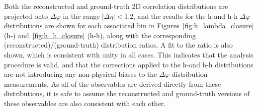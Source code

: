 Both the reconstructed and ground-truth 2D correlation distributions are projected onto $\Delta\varphi$ in the range $|\Delta\eta| < 1.2$, and the results for the h-\lmb and h-h $\Delta\varphi$ distributions are shown for each associated \pt bin in Figures~\ref{fig:h_lambda_closure} (h-\lmb) and~\ref{fig:h_h_closure} (h-h), along with the corresponding (reconstructed)/(ground-truth) distribution ratios. A fit to the ratio is also shown, which is consistent with unity in all cases. This indicates that the analysis procedure is valid, and that the corrections applied to the h-\lmb and h-h distributions are not introducing any non-physical biases to the $\Delta\varphi$ distribution measurements. As all of the observables are derived directly from these distributions, it is safe to assume the reconstructed and ground-truth versions of these observables are also consistent with each other.

